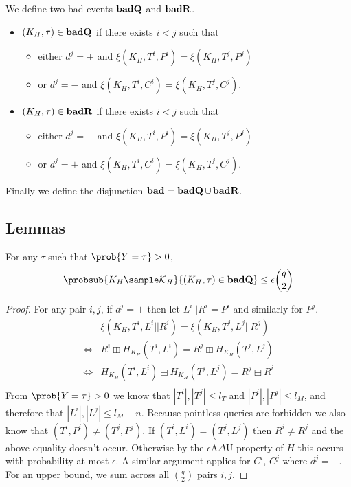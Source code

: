 \documentclass[eprint.tex]{subfiles}
\begin{document}
We define two bad events $\operatorname{\mathbf{badQ}}$ and $\operatorname{\mathbf{badR}}$.

\begin{itemize}
    \item $(K_H, \tau) \in \operatorname{\mathbf{badQ}}$ if there exists $i < j$ such that
    \begin{itemize}
        \item either $d^j = +$ and $\xi(K_H, T^i, P^i) = \xi(K_H, T^j, P^j)$
        \item or $d^j = -$ and $\xi(K_H, T^i, C^i) = \xi(K_H, T^j, C^j)$.
    \end{itemize}
    \item $(K_H, \tau) \in \operatorname{\mathbf{badR}}$ if there exists $i < j$ such that
    \begin{itemize}
        \item either $d^j = -$ and $\xi(K_H, T^i, P^i) = \xi(K_H, T^j, P^j)$
        \item or $d^j = +$ and $\xi(K_H, T^i, C^i) = \xi(K_H, T^j, C^j)$.
    \end{itemize}
\end{itemize}

Finally we define the disjunction
$\operatorname{\mathbf{bad}} = \operatorname{\mathbf{badQ}} \cup \operatorname{\mathbf{badR}}$.

\subsection{Lemmas}
\begin{lemma} \label{badQ}
    For any $\tau$ such that $\prob{Y = \tau} > 0$,
    \begin{displaymath}
        \probsub{K_H \sample \mathcal{K}_H}{(K_H, \tau) \in \badQ}
        \leq \epsilon \binom{q}{2}
    \end{displaymath}
\end{lemma}

\begin{proof}
For any pair $i, j$, if $d^j = +$ then let $L^i || R^i = P^i$ and similarly for $P^j$.
\begin{align*}
    &\xi(K_H, T^i, L^i||R^i) = \xi(K_H, T^j, L^j||R^j) \\
    \Leftrightarrow& R^i \boxplus H_{K_H}(T^i, L^i) = R^j \boxplus H_{K_H}(T^j, L^j) \\
    \Leftrightarrow& H_{K_H}(T^i, L^i) \boxminus H_{K_H}(T^j, L^j) = R^j \boxminus R^i \\
\end{align*}
From $\prob{Y = \tau} > 0$ we know that $|T^i|, |T^j| \leq l_T$ and $|P^i|, |P^j| \leq l_M$,
and therefore that $|L^i|, |L^j| \leq l_M - n$.
Because pointless queries are forbidden we also know that $(T^i, P^i) \neq (T^j, P^j)$.
If $(T^i, L^i) = (T^j, L^j)$ then $R^i \neq R^j$ and the above equality doesn't occur.
Otherwise by the $\epsilon$A$\Delta$U property of $H$ this occurs with probability
at most $\epsilon$.
A similar argument applies for $C^i$, $C^j$ where $d^j = -$.
For an upper bound, we sum across all $\binom{q}{2}$ pairs $i, j$.
\end{proof}
\end{document}
